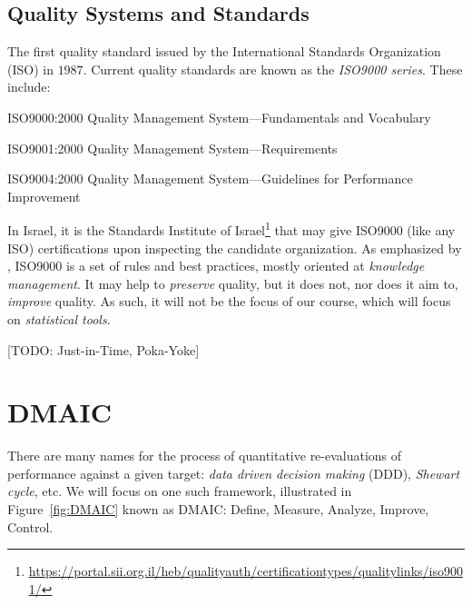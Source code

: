 \subsection{Quality Systems and Standards}
The first quality standard issued by the International Standards Organization (ISO) in $1987$.
Current quality standards are known as the \emph{ISO9000 series}. These include:
\begin{description}
\item ISO9000:2000 Quality Management System—Fundamentals and Vocabulary
\item ISO9001:2000 Quality Management System—Requirements
\item ISO9004:2000 Quality Management System—Guidelines for Performance Improvement
\end{description}
In Israel, it is the Standards Institute of Israel\footnote{\url{https://portal.sii.org.il/heb/qualityauth/certificationtypes/qualitylinks/iso9001/}} that may give ISO9000 (like any ISO) certifications upon inspecting the candidate organization.
As emphasized by \citet[p.24]{montgomery_introduction_2007}, ISO9000 is a set of rules and best practices, mostly oriented at \emph{knowledge management}. 
It may help to \emph{preserve} quality, but it does not, nor does it aim to, \emph{improve} quality.
As such, it will not be the focus of our course, which will focus on \emph{statistical tools}.


\begin{extra}

[TODO: Just-in-Time, Poka-Yoke]

\end{extra}




\section{DMAIC}
There are many names for the process of quantitative re-evaluations of performance against a given target: \emph{data driven decision making} (DDD), \emph{Shewart cycle}, etc.
We will focus on one such framework, illustrated in Figure~\ref{fig:DMAIC} known as DMAIC: Define, Measure, Analyze, Improve, Control.


